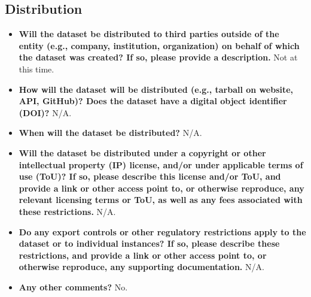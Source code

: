 \documentclass[11pt]{article}
\begin{document}
\subsection{Distribution}
\begin{itemize}
    \item \textbf{Will the dataset be distributed to third parties outside of the entity (e.g., company, institution, organization) on behalf of which the dataset was created? If so, please provide a description.} Not at this time.
    \item \textbf{How will the dataset will be distributed (e.g., tarball on website, API, GitHub)? Does the dataset have a digital object identifier (DOI)?} N/A.
    \item \textbf{When will the dataset be distributed?} N/A.
    \item \textbf{Will the dataset be distributed under a copyright or other intellectual property (IP) license, and/or under applicable terms of use (ToU)? If so, please describe this license and/or ToU, and provide a link or other access point to, or otherwise reproduce, any relevant licensing terms or ToU, as well as any fees associated with these restrictions.} N/A.
    \item \textbf{Do any export controls or other regulatory restrictions apply to the dataset or to individual instances? If so, please describe these restrictions, and provide a link or other access point to, or otherwise reproduce, any supporting documentation.} N/A.
    \item \textbf{Any other comments?} No.
\end{itemize}
\end{document}
